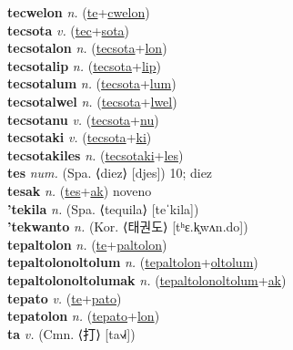 \textbf{tecwelon} \textit{n.} (\hyperref[te]{te}+\hyperref[cwelon]{cwelon})
 \label{tecwelon} \\
\textbf{tecsota} \textit{v.} (\hyperref[tec]{tec}+\hyperref[sota]{sota})
 \label{tecsota} \\
\textbf{tecsotalon} \textit{n.} (\hyperref[tecsota]{tecsota}+\hyperref[lon]{lon})
 \label{tecsotalon} \\
\textbf{tecsotalip} \textit{n.} (\hyperref[tecsota]{tecsota}+\hyperref[lip]{lip})
 \label{tecsotalip} \\
\textbf{tecsotalum} \textit{n.} (\hyperref[tecsota]{tecsota}+\hyperref[lum]{lum})
 \label{tecsotalum} \\
\textbf{tecsotalwel} \textit{n.} (\hyperref[tecsota]{tecsota}+\hyperref[lwel]{lwel})
 \label{tecsotalwel} \\
\textbf{tecsotanu} \textit{v.} (\hyperref[tecsota]{tecsota}+\hyperref[nu]{nu})
 \label{tecsotanu} \\
\textbf{tecsotaki} \textit{v.} (\hyperref[tecsota]{tecsota}+\hyperref[ki]{ki})
 \label{tecsotaki} \\
\textbf{tecsotakiles} \textit{n.} (\hyperref[tecsotaki]{tecsotaki}+\hyperref[les]{les})
 \label{tecsotakiles} \\
\textbf{tes} \textit{num.} (Spa. ⟨diez⟩ [djes])
10; diez \label{tes} \\
\textbf{tesak} \textit{n.} (\hyperref[tes]{tes}+\hyperref[ak]{ak})
noveno \label{tesak} \\
\textbf{'tekila} \textit{n.} (Spa. ⟨tequila⟩ [teˈkila])
 \label{'tekila} \\
\textbf{'tekwanto} \textit{n.} (Kor. ⟨태권도⟩ [tʰɛ.k͈wʌn.do])
 \label{'tekwanto} \\
\textbf{tepaltolon} \textit{n.} (\hyperref[te]{te}+\hyperref[paltolon]{paltolon})
 \label{tepaltolon} \\
\textbf{tepaltolonoltolum} \textit{n.} (\hyperref[tepaltolon]{tepaltolon}+\hyperref[oltolum]{oltolum})
 \label{tepaltolonoltolum} \\
\textbf{tepaltolonoltolumak} \textit{n.} (\hyperref[tepaltolonoltolum]{tepaltolonoltolum}+\hyperref[ak]{ak})
 \label{tepaltolonoltolumak} \\
\textbf{tepato} \textit{v.} (\hyperref[te]{te}+\hyperref[pato]{pato})
 \label{tepato} \\
\textbf{tepatolon} \textit{n.} (\hyperref[tepato]{tepato}+\hyperref[lon]{lon})
 \label{tepatolon} \\
\textbf{ta} \textit{v.} (Cmn. ⟨打⟩ [ta˧˩˧])
 \label{ta} \\
